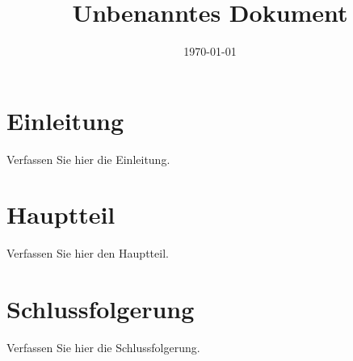 \documentclass{article}
\title{Unbenanntes Dokument}
\author{}
\date{\today}
\begin{document}
\maketitle

\section{Einleitung}
Verfassen Sie hier die Einleitung.

\section{Hauptteil}
Verfassen Sie hier den Hauptteil.

\section{Schlussfolgerung}
Verfassen Sie hier die Schlussfolgerung.
\end{document}
